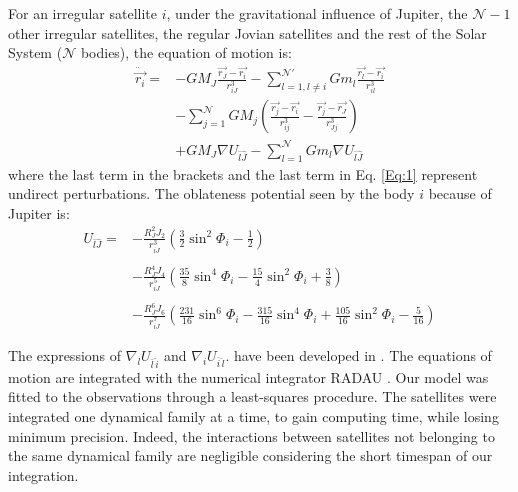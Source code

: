 For an irregular satellite $i$, under the gravitational influence of Jupiter, the $\mathcal{N}-1$ other irregular satellites, the regular Jovian satellites and the rest of the Solar System ($\mathcal{N}$ bodies), the equation of motion is:
\begin{equation}\begin{array}{ll}

\ddot{\vec{r_i}}= & \displaystyle -GM_J\frac{\vec{r_J}-\vec{r_i}}{r_{iJ}^3}-\sum_{l=1,l\neq i}^\mathcal{N'}Gm_l\frac{\vec{r_l}-\vec{r_i}}{r_{il}^3}\\
&\displaystyle -\sum_{j=1}^\mathcal{N}GM_j \left(\frac{\vec{r_j}-\vec{r_i}}{r_{ij}^3} - \frac{\vec{r_j}-\vec{r_J}}{r_{Jj}^3} \right)\\
 & \displaystyle +GM_J \nabla U_{\bar{l}\hat{J}} -\sum_{l=1}^\mathcal{N} Gm_l\nabla U_{\bar{l}\hat{J}}
\end{array}
\label{Eq:1}
\end{equation}
where the last term in the brackets and the last term in Eq. \ref{Eq:1} represent undirect perturbations. The oblateness potential seen by the body $i$ because of Jupiter is:
\begin{equation}\begin{array}{ll}

U_{\bar{l}\hat{J}}=&\displaystyle -\frac{R_J^2 J_2}{r_{iJ}^3}\left(\frac{3}{2}\sin^2 \Phi_i-\frac{1}{2}\right)\\ &\\ & 
\displaystyle-\frac{R_J^4 J_4}{r_{iJ}^5}\left(\frac{35}{8}\sin^4 \Phi_i-\frac{15}{4}\sin^2 \Phi_i+\frac{3}{8}\right)\\
& \\
&\displaystyle-\frac{R_J^6 J_6}{r_{iJ}^7}\left(\frac{231}{16}\sin^6 \Phi_i-\frac{315}{16}\sin^4 \Phi_i+\frac{105}{16}\sin^2 \Phi_i-\frac{5}{16}\right)

\end{array}
\end{equation}

The expressions of $\nabla_lU_{\bar{l}\, \hat{i}}$ and $\nabla_i U_{\bar{i}\, \hat{l}}.$ have been developed in \citet{Lainey2004}. The equations of motion are integrated with the numerical integrator RADAU \citep{Everhart1985}. 
Our model was fitted to the observations through a least-squares procedure. The satellites were integrated one dynamical family at a time, to gain computing time, while losing minimum precision. Indeed, the interactions between satellites not belonging to the same dynamical family are negligible considering the short timespan of our integration. 

